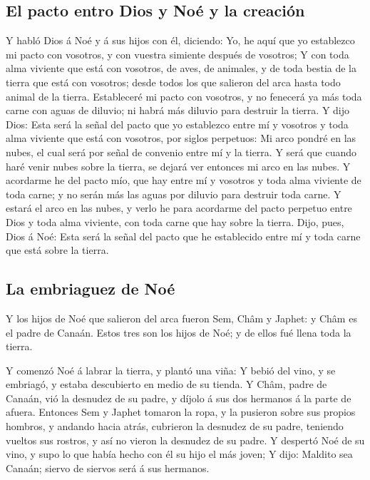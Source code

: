 \hypertarget{el-pacto-entro-dios-y-nouxe9-y-la-creaciuxf3n}{%
\subsection{El pacto entro Dios y Noé y la
creación}\label{el-pacto-entro-dios-y-nouxe9-y-la-creaciuxf3n}}

 Y habló Dios á Noé y á sus hijos con él, diciendo:
 Yo, he aquí que yo establezco mi pacto con vosotros, y
con vuestra simiente después de vosotros;  Y con toda
alma viviente que está con vosotros, de aves, de animales, y de toda
bestia de la tierra que está con vosotros; desde todos los que salieron
del arca hasta todo animal de la tierra.  Estableceré mi
pacto con vosotros, y no fenecerá ya más toda carne con aguas de
diluvio; ni habrá más diluvio para destruir la tierra.  Y
dijo Dios: Esta será la señal del pacto que yo establezco entre mí y
vosotros y toda alma viviente que está con vosotros, por siglos
perpetuos:  Mi arco pondré en las nubes, el cual será por
señal de convenio entre mí y la tierra.  Y será que
cuando haré venir nubes sobre la tierra, se dejará ver entonces mi arco
en las nubes.  Y acordarme he del pacto mío, que hay
entre mí y vosotros y toda alma viviente de toda carne; y no serán más
las aguas por diluvio para destruir toda carne.  Y estará
el arco en las nubes, y verlo he para acordarme del pacto perpetuo entre
Dios y toda alma viviente, con toda carne que hay sobre la tierra.
 Dijo, pues, Dios á Noé: Esta será la señal del pacto que
he establecido entre mí y toda carne que está sobre la tierra.

\hypertarget{la-embriaguez-de-nouxe9}{%
\subsection{La embriaguez de Noé}\label{la-embriaguez-de-nouxe9}}

 Y los hijos de Noé que salieron del arca fueron Sem,
Châm y Japhet: y Châm es el padre de Canaán.  Estos tres
son los hijos de Noé; y de ellos fué llena toda la tierra.

 Y comenzó Noé á labrar la tierra, y plantó una viña:
 Y bebió del vino, y se embriagó, y estaba descubierto en
medio de su tienda.  Y Châm, padre de Canaán, vió la
desnudez de su padre, y díjolo á sus dos hermanos á la parte de afuera.
 Entonces Sem y Japhet tomaron la ropa, y la pusieron
sobre sus propios hombros, y andando hacia atrás, cubrieron la desnudez
de su padre, teniendo vueltos sus rostros, y así no vieron la desnudez
de su padre.  Y despertó Noé de su vino, y supo lo que
había hecho con él su hijo el más joven;  Y dijo: Maldito
sea Canaán; siervo de siervos será á sus hermanos.

